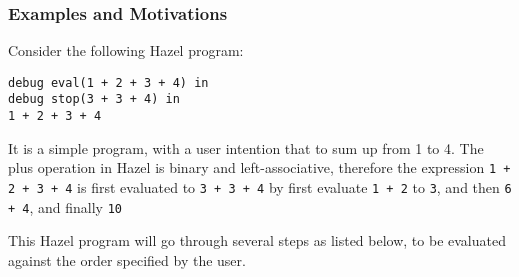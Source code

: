 
\subsubsection{Examples and Motivations}\label{sec:filter_example}

Consider the following Hazel program:
\lstset{xleftmargin=1in}
\begin{lstlisting}[language=hazel,caption={A simple Hazel program}]
debug eval(1 + 2 + 3 + 4) in
debug stop(3 + 3 + 4) in
1 + 2 + 3 + 4\end{lstlisting}

It is a simple program, with a user intention that to sum up from 1 to
4. The plus operation in Hazel is binary and left-associative,
therefore the expression \lstinline[language=hazel]{1 + 2 + 3 + 4} is
first evaluated to \lstinline[language=hazel]{3 + 3 + 4} by first
evaluate \lstinline[language=hazel]{1 + 2} to
\lstinline[language=hazel]{3}, and then
\lstinline[language=hazel]{6 + 4}, and finally
\lstinline[language=hazel]{10}

This Hazel program will go through several steps as listed below, to
be evaluated against the order specified by the user.

